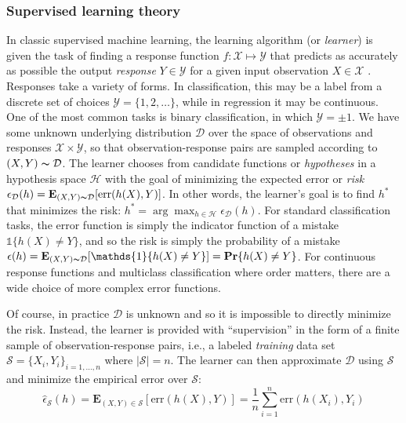 \subsubsection{Supervised learning theory}

In classic supervised machine learning, the learning algorithm (or \textit{learner}) is given the task of finding a response function $f: \mathcal{X} \mapsto \mathcal{Y}$ that predicts as accurately as possible the output \textit{response} $Y \in \mathcal{Y}$ for a given input observation	 $X \in \mathcal{X}$ \cite{Mohri:2012}. Responses take a variety of forms. In classification, this may be a label from a discrete set of choices $\mathcal{Y} = \{ 1, 2, \dots\}$, while in regression it may be continuous. One of the most common tasks is binary classification, in which $\mathcal{Y} = \pm1$. We have some unknown underlying distribution $\mathcal{D}$ over the space of observations and responses $\mathcal{X} \times \mathcal{Y}$, so that observation-response pairs are sampled according to $(X, Y) \thicksim \mathcal{D}$. The learner chooses from candidate functions or \textit{hypotheses} in a hypothesis space $\mathcal{H}$ with the goal of minimizing the expected error or \textit{risk} $\epsilon_\mathcal{D}(h) = \mathbf{E}_{(X,Y)\thicksim \mathcal{D}}[\mathrm{err}(h(X), Y)]$. In other words, the learner's goal is to find $h^\ast$ that minimizes the risk: $h^\ast = \arg\max_{h \in \mathcal{H}} \epsilon_{\mathcal{D}}(h)$. For standard classification tasks, the error function is simply the indicator function of a mistake $\mathds{1}\{h(X) \not= Y\}$, and so the risk is simply the probability of a mistake $\epsilon(h) = \mathbf{E}_{(X,Y)\thicksim \mathcal{D}}[\mathds{1}\{h(X) \not= Y\}] = \mathbf{Pr}\{h(X) \not= Y\}$. For continuous response functions and multiclass classification where order matters, there are a wide choice of more complex error functions.

Of course, in practice $\mathcal{D}$ is unknown and so it is impossible to directly minimize the risk. Instead, the learner is provided with ``supervision'' in the form of a finite sample of observation-response pairs, i.e., a labeled \textit{training} data set $\mathcal{S} = \{ X_i, Y_i \}_{i=1, \dots, n}$ where $|\mathcal{S}| = n$. The learner can then approximate $\mathcal{D}$ using $\mathcal{S}$ and minimize the empirical error over $\mathcal{S}$:
\[
\hat{\epsilon}_{\mathcal{S}}(h) = \mathbf{E}_{(X,Y) \in \mathcal{S}}[\mathrm{err}(h(X), Y)] = \frac{1}{n} \sum_{i=1}^n \mathrm{err}(h(X_i), Y_i)
\]

